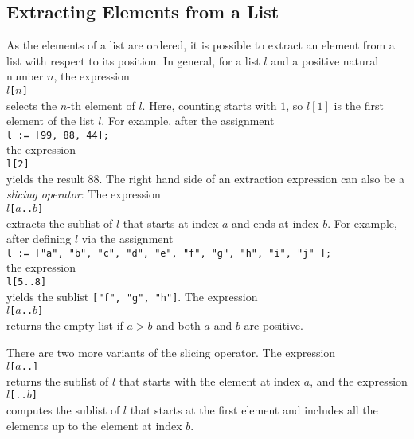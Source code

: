 \subsection{Extracting Elements from a List}
As the elements of a list are ordered, it is possible to extract an element from a list with respect
to its position.  In general, for a list $l$ and a positive natural number $n$, the expression
\\[0.2cm]
\hspace*{1.3cm}
\texttt{$l$[$n$]}
\\[0.2cm]
selects the $n$-th element of $l$.  Here, counting starts with $1$, so $l[1]$ is the first element
of the list $l$.  For example, after the assignment
\\[0.2cm]
\hspace*{1.3cm}
\texttt{l := [99, 88, 44];}
\\[0.2cm]
the expression 
\\[0.2cm]
\hspace*{1.3cm}
\texttt{l[2]}
\\[0.2cm]
yields the result $88$.  The right hand side of an extraction expression can also be a \emph{slicing operator}:
The expression
\\[0.2cm]
\hspace*{1.3cm}
\texttt{$l$[$a$..$b$]}
\\[0.2cm]
extracts the sublist of $l$ that starts at index $a$ and ends at index $b$.  For example,
after defining $l$ via the assignment
\\[0.2cm]
\hspace*{1.3cm}
\texttt{l := ["a", "b", "c", "d", "e", "f", "g", "h", "i", "j" ];}
\\[0.2cm]
the expression
\\[0.2cm]
\hspace*{1.3cm}
\texttt{l[5..8]}
\\[0.2cm]
yields the sublist \texttt{["f", "g", "h"]}.  The  expression 
\\[0.2cm]
\hspace*{1.3cm}
\texttt{$l$[$a$..$b$]}
\\[0.2cm]
returns the empty list if $a > b$ and both $a$ and $b$ are positive.  

There are two more variants of the slicing operator.   The expression
\\[0.2cm]
\hspace*{1.3cm}
\texttt{$l$[$a$..]}
\\[0.2cm]
returns the sublist of $l$ that starts with the element at index $a$, and the expression
\\[0.2cm]
\hspace*{1.3cm}
\texttt{$l$[..$b$]}
\\[0.2cm]
computes the sublist of $l$ that starts at the first element and includes all the elements up to the
element at index $b$.

